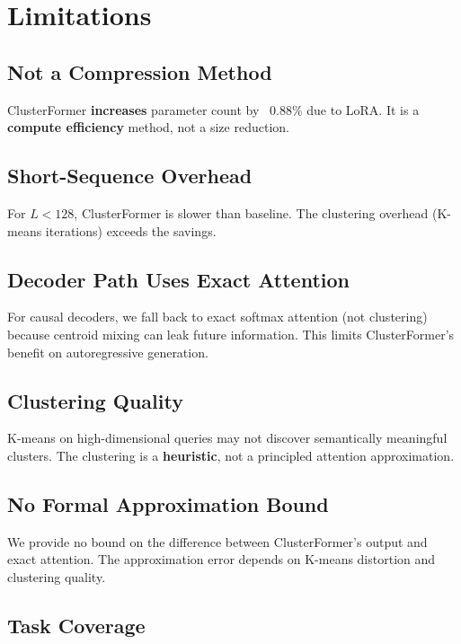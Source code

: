 \section{Limitations}

\subsection{Not a Compression Method}

ClusterFormer \textbf{increases} parameter count by ~0.88\% due to 
LoRA. It is a \textbf{compute efficiency} method, not a size reduction.

\subsection{Short-Sequence Overhead}

For $L < 128$, ClusterFormer is slower than baseline. The clustering 
overhead (K-means iterations) exceeds the savings.

\subsection{Decoder Path Uses Exact Attention}

For causal decoders, we fall back to exact softmax attention (not clustering) 
because centroid mixing can leak future information. This limits 
ClusterFormer's benefit on autoregressive generation.

\subsection{Clustering Quality}

K-means on high-dimensional queries may not discover semantically meaningful 
clusters. The clustering is a \textbf{heuristic}, not a principled attention 
approximation.

\subsection{No Formal Approximation Bound}

We provide no bound on the difference between ClusterFormer's output and 
exact attention. The approximation error depends on K-means distortion 
and clustering quality.

\subsection{Task Coverage}

